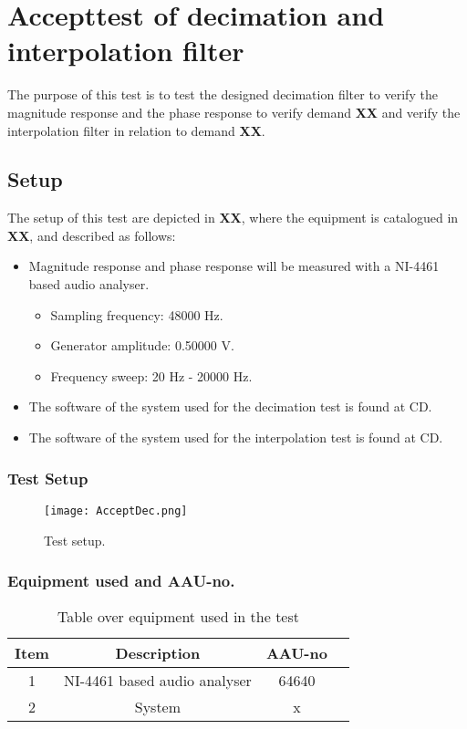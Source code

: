 \chapter{Accepttest of decimation and interpolation filter}\label{app:journal_decimationFilter}
The purpose of this test is to test the designed decimation filter to verify the magnitude response and the phase response to verify demand \textbf{XX} and verify the interpolation filter in relation to demand \textbf{XX}.

\section{Setup}
The setup of this test are depicted in \textbf{XX}, where the equipment is catalogued in \textbf{XX}, and described as follows:

\begin{itemize}
\item Magnitude response and phase response will be measured with a NI-4461 based audio analyser. 
\begin{itemize}
\item Sampling frequency: 48000 Hz.
\item Generator amplitude: 0.50000 V.
\item Frequency sweep: 20 Hz - 20000 Hz.
\end{itemize}
\item The software of the system used for the  decimation test is found at CD. 
\item The software of the system used for the  interpolation test is found at CD. 
\end{itemize}


\subsection*{Test Setup}
\begin{figure}[H]
\centering
\texttt{[image: AcceptDec.png]}
\label{fig:AcceptDec}
\caption{Test setup.}
\end{figure}

\subsection*{Equipment used and AAU-no.}

\begin{table}[H]
\centering
{}
\begin{tabular}{S[table-format=1]ccc} \toprule
    {Item} & {Description} & {AAU-no} \\       &  NI-4461 based audio analyser  & 64640  \\ 
    2      &  System  & x  \\  \bottomrule 
\end{tabular}
\caption{Table over equipment used in the test}
\label{tab:UsedEquipmentDecimation}
\end{table}
\vspace{-5mm}



